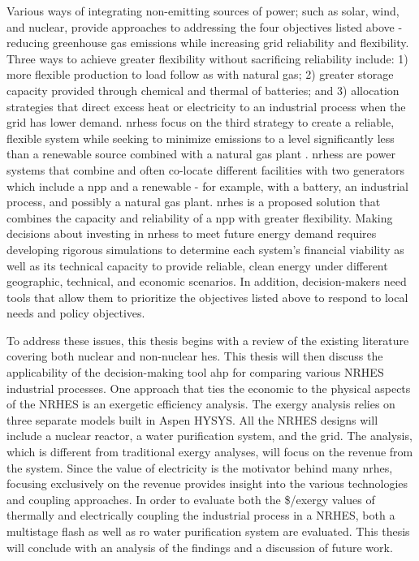 Various ways of integrating non-emitting sources of power; such as solar, wind, and nuclear, provide approaches to addressing the four objectives listed above - reducing greenhouse gas emissions while increasing grid reliability and flexibility. Three ways to achieve greater flexibility without sacrificing reliability include: 1) more flexible production to load follow as with natural gas; 2) greater storage capacity provided through chemical and thermal of batteries; and 3)  allocation strategies that direct excess heat or electricity to an industrial process when the grid has lower demand. \ac{nrhess} focus on the third strategy to create a reliable, flexible system while seeking to minimize emissions to a level significantly less than a renewable source combined with a natural gas plant \cite{Baker2016}. \ac{nrhess} are power systems that combine and often co-locate different facilities with two generators which include a \ac{npp} and a renewable - for example, with a battery, an industrial process, and possibly a natural gas plant.  \ac{nrhes} is a proposed solution that combines the capacity and reliability of a \ac{npp} with greater flexibility.
Making decisions about investing in \ac{nrhess} to meet future energy demand requires developing rigorous simulations to determine each system's financial viability as well as its technical capacity to provide reliable, clean energy under different geographic, technical, and economic scenarios. In addition, decision-makers need tools that allow them to prioritize the objectives listed above to respond to local needs and policy objectives.


To address these issues, this thesis begins with a review of the existing literature covering both nuclear and non-nuclear \ac{hes}.  This thesis will then discuss the applicability of the decision-making tool \ac{ahp} for comparing various NRHES industrial processes. One approach that ties the economic to the physical aspects of the NRHES is an exergetic efficiency analysis. The exergy analysis relies on three separate models built in Aspen HYSYS. All the NRHES designs will include a nuclear reactor, a water purification system, and the grid. The analysis, which is different from traditional exergy analyses, will focus on the revenue from the system.  Since the value of electricity is the motivator behind many \ac{nrhes}, focusing exclusively on the revenue provides insight into the various technologies and coupling approaches. In order to evaluate both the \$/exergy values of thermally and electrically coupling the industrial process in a NRHES, both a multistage flash as well as \ac{ro} water purification system are evaluated.  This thesis will conclude with an analysis of the findings and a discussion of future work.

